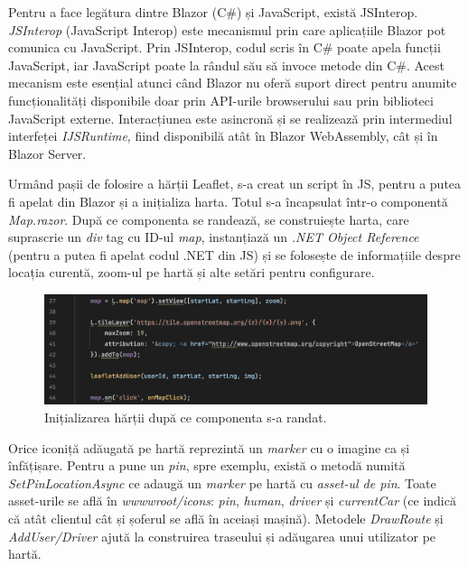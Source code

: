 Pentru a face legătura dintre Blazor (C\#) și JavaScript, există JSInterop. \textit{JSInterop}
(JavaScript Interop) este mecanismul prin care aplicațiile Blazor pot comunica cu
JavaScript. Prin JSInterop, codul scris în C\# poate apela funcții JavaScript, iar
JavaScript poate la rândul său să invoce metode din C\#. Acest mecanism este esențial
atunci când Blazor nu oferă suport direct pentru anumite funcționalități disponibile
doar prin API-urile browserului sau prin biblioteci JavaScript externe. Interacțiunea
este asincronă și se realizează prin intermediul interfeței \textit{IJSRuntime}, fiind
disponibilă atât în Blazor WebAssembly, cât și în Blazor Server. \parencite{blazor}

Urmând pașii de folosire a hărții Leaflet, s-a creat un script în JS, pentru a putea fi
apelat din Blazor și a inițializa harta. Totul s-a încapsulat într-o componentă \textit{Map.razor}.
După ce componenta se randează, se construiește harta, care suprascrie un \textit{div} tag cu ID-ul \textit{map}, instanțiază
un \textit{.NET Object Reference} (pentru a putea fi apelat codul .NET din JS) și se folosește de informațiile despre locația curentă, zoom-ul
pe hartă și alte setări pentru configurare.

\begin{figure}[H]
    \centering
    \includegraphics[width=16cm]{Assets/initLeaflet.png}
    \caption{Inițializarea hărții după ce componenta s-a randat.}
    \label{fig:initLeaflet}
\end{figure}

Orice iconiță adăugată pe hartă reprezintă un \textit{marker} cu o imagine ca și înfățișare. Pentru a pune un \textit{pin}, spre exemplu, există o metodă numită \textit{SetPinLocationAsync} ce adaugă un \textit{marker} pe hartă cu \textit{asset-ul de pin}.
Toate asset-urile se află în \textit{wwwwroot/icons}: \textit{pin}, \textit{human}, \textit{driver} și \textit{currentCar} (ce indică că atât clientul cât și șoferul se află în aceiași mașină).
Metodele \textit{DrawRoute} și \textit{AddUser/Driver} ajută la construirea traseului și adăugarea unui utilizator pe hartă.

